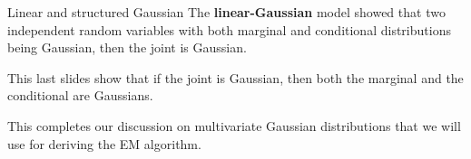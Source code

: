 \documentclass{beamer}
\newcommand{\bs}[1]{\boldsymbol{#1}}
\newcommand{\oncolor}[2]{\only<#1>{\color{#2}}}
\begin{document}

\begin{frame}{Linear and structured Gaussian}
 The \textbf{linear-Gaussian} model showed that two independent random variables with both marginal and conditional distributions being Gaussian, then the joint is Gaussian.\vspace{3mm}
 
 This last slides show that if the joint is Gaussian, then both the marginal and the conditional are Gaussians.\vspace{3mm}
 
 This completes our discussion on multivariate Gaussian distributions that we will use for deriving the EM algorithm.
\end{frame}
\end{document}
